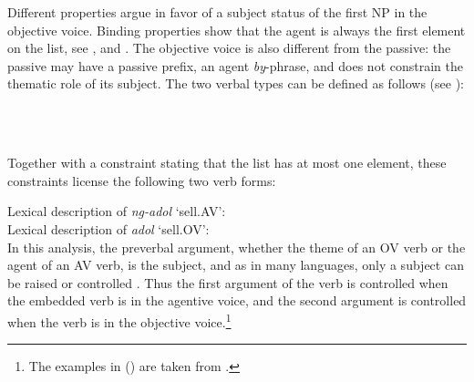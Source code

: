 Different properties argue in favor of a subject status of the first NP in the objective
voice. Binding properties show that the agent is always the first element on the \argst list, see
,  and . The objective
voice is also different from the passive: the passive may have a passive prefix, an agent
\emph{by}-phrase, and does not constrain the thematic role of its subject. The two verbal types can
be defined as follows (see ):

\eal
\ex 
{} \impl\\
\ex 
{} \impl\\
\zl

Together with a constraint stating that the \subj list has at most one element, these constraints license the following two verb forms:

\eal
\ex 
Lexical description of \emph{ng-adol} `sell.AV':\\
\ex 
Lexical description of \emph{adol} `sell.OV':\\
\zl
In this analysis, the preverbal argument, whether the theme of an OV verb or the agent of an AV
verb, is the subject, and as in many languages, only a subject can be raised or controlled
\citep{Chomsky1981,Zaenenetal1985}. Thus the first argument of the verb is controlled when the embedded verb is
in the agentive voice, and the second argument
is controlled when the verb is in the objective
voice.\footnote{%
  The examples in () are taken from .
}


